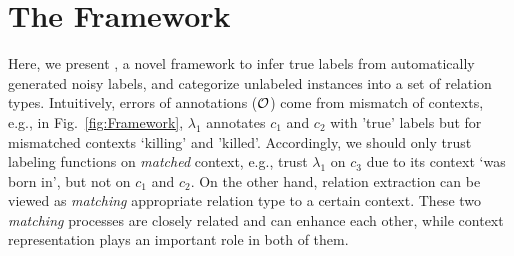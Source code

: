 

\section{The \our Framework}
\label{sect:method}



Here, we present \our, a novel framework to infer true labels from automatically generated noisy labels, and categorize unlabeled instances into a set of relation types.
Intuitively, errors of annotations ($\mathcal{O}$) come from  mismatch of contexts, e.g., in Fig.~\ref{fig:Framework}, $\lambda_1$ annotates $c_1$ and $c_2$ with 'true' labels but for mismatched contexts `killing' and 'killed'. 
Accordingly, we should only trust labeling functions on \emph{matched} context, e.g., trust $\lambda_1$ on $c_3$ due to its context `was born in', but not on $c_1$ and $c_2$. 
On the other hand, relation extraction can be viewed as \emph{matching} appropriate relation type to a certain context.
These two \emph{matching} processes are closely related and can enhance each other, while context representation plays an important role in both of them.

